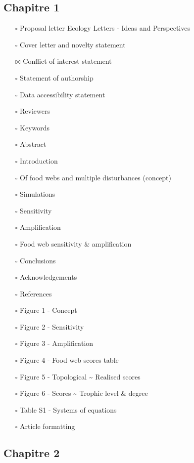 \hypertarget{chapitre-1}{%
\subsection{Chapitre 1}\label{chapitre-1}}

\begin{itemize}
\tightlist
\item[$\square$]
  Proposal letter Ecology Letters - Ideas and Perspectives
\item[$\square$]
  Cover letter and novelty statement
\item[$\boxtimes$]
  Conflict of interest statement
\item[$\square$]
  Statement of authorship
\item[$\square$]
  Data accessibility statement
\item[$\square$]
  Reviewers
\item[$\square$]
  Keywords
\item[$\square$]
  Abstract
\item[$\square$]
  Introduction
\item[$\square$]
  Of food webs and multiple disturbances (concept)
\item[$\square$]
  Simulations
\item[$\square$]
  Sensitivity
\item[$\square$]
  Amplification
\item[$\square$]
  Food web sensitivity \& amplification
\item[$\square$]
  Conclusions
\item[$\square$]
  Acknowledgements
\item[$\square$]
  References
\item[$\square$]
  Figure 1 - Concept
\item[$\square$]
  Figure 2 - Sensitivity
\item[$\square$]
  Figure 3 - Amplification
\item[$\square$]
  Figure 4 - Food web scores table
\item[$\square$]
  Figure 5 - Topological \textasciitilde{} Realised scores
\item[$\square$]
  Figure 6 - Scores \textasciitilde{} Trophic level \& degree
\item[$\square$]
  Table S1 - Systems of equations
\item[$\square$]
  Article formatting
\end{itemize}

\hypertarget{chapitre-2}{%
\subsection{Chapitre 2}\label{chapitre-2}}

